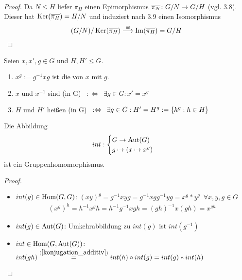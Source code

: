 \begin{proof}
	Da $N \leq H$ liefer $\pi_H$ einen Epimorphismus $\overline{\pi_N} \colon G/N \to G/H$ (vgl. 3.8). Dieser hat $\operatorname{Ker}(\overline{\pi_H}) = H/N$ und induziert nach 3.9 einen Isomorphismus 
	\begin{align*}
		(G/N)/\operatorname{Ker}(\overline{\pi_H}) \overset{\cong}{\longrightarrow} \operatorname{Im}(\overline{\pi_H}) = G/H
	\end{align*}
\end{proof}
%
\begin{defin}
	Seien $x,x',g \in G$ und $H,H' \leq G$.
	\begin{enumerate}
		\item $x^g := g^{-1}xg$ ist die  von $x$ mit $g$.
		\item $x$ und $x^{-1}$ sind  (in G) $\enspace :\Leftrightarrow \enspace \exists g \in G : x' = x^g$
		\item $H$ und $H'$ heißen  (in G) $\enspace : \Leftrightarrow \enspace \exists g \in G : H' = H^g := \{ h^g : h \in H \}$
	\end{enumerate}
\end{defin}
%
\begin{lemma}
	Die Abbildung
	\begin{align*}
		int: \begin{cases}
		G \to \operatorname{Aut}(G) \\ g \mapsto (x \mapsto x^g)
		\end{cases}
	\end{align*}
	ist ein Gruppenhomomorphismus.
\end{lemma}
\begin{proof}
	\begin{itemize}
		\item $int(g) \in \operatorname{Hom}(G,G)$: \hspace{5mm} $(xy)^g=g^{-1}xyg=g^{-1}xgg^{-1}yg = x^g * y^g \enspace \forall x,y,g \in  G$
		\Item \begin{align} \label{konjugation_additiv}%
			(x^g)^h = h^{-1} x^g h = h^{-1}g^{-1} x gh = (gh)^{-1} x (gh) = x^{gh}%
		\end{align}
		\item $int(g) \in \operatorname{Aut}(G)$: \hspace{5mm} Umkehrabbildung zu $int(g)$ ist $int(g^{-1})$
		\item $int \in \operatorname{Hom}(G,\operatorname{Aut}(G))$: \hspace{5mm} $int(gh) \overset{(\ref{konjugation_additiv})}{=} int(h) \circ int(g) = int(g) * int(h)$
	\end{itemize}
\end{proof}
